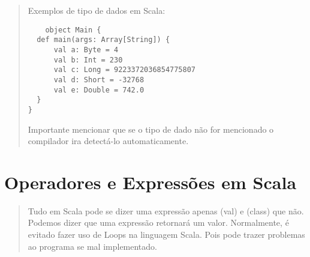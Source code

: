 \begin{quote}
  \hspace{2.5mm} Exemplos de tipo de dados em Scala:

  \begin{lstlisting}
    object Main {
  def main(args: Array[String]) {
      val a: Byte = 4
      val b: Int = 230
      val c: Long = 9223372036854775807
      val d: Short = -32768
      val e: Double = 742.0
  }
}
    \end{lstlisting}

  Importante mencionar que se o tipo de dado não for mencionado o compilador ira detectá-lo automaticamente.
\end{quote}



\section{Operadores e Express\~{o}es em Scala}
\begin{quote}
  Tudo em Scala pode se dizer uma expressão apenas {\color{red}(val)} e {\color{red}(class)} que não. Podemos dizer que uma expressão retornará um valor. Normalmente, é evitado fazer uso de Loops na linguagem Scala. Pois pode trazer problemas ao programa se mal implementado.
  \cite{Wampler2021}
\end{quote}


